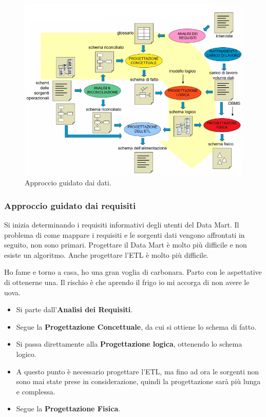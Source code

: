 \begin{figure}[H]
	\begin{center}
		\includegraphics[width=0.8\linewidth]{img/data_approach.png}
		\caption{Approccio guidato dai dati.}
	\end{center}
\end{figure}

\subsubsection{Approccio guidato dai requisiti}
Si inizia determinando i requisiti informativi degli utenti del Data Mart. Il problema di come mappare i requisiti e le sorgenti dati vengono affrontati in seguito, non sono primari.\newline
Progettare il Data Mart è molto più difficile e non esiste un algoritmo. Anche progettare l'ETL è molto più difficile.
\begin{info}
	Ho fame e torno a casa, ho una gran voglia di carbonara. Parto con le aspettative di ottenerne una. Il rischio è che aprendo il frigo io mi accorga di non avere le uova.
\end{info}

\begin{itemize}
	\item Si parte dall'\textbf{Analisi dei Requisiti}.
	\item Segue la \textbf{Progettazione Concettuale}, da cui si ottiene lo schema di fatto.
	\item Si passa direttamente alla \textbf{Progettazione logica}, ottenendo lo schema logico.
	\item A questo punto è necessario progettare l'ETL, ma fino ad ora le sorgenti non sono mai state prese in considerazione, quindi la progettazione sarà più lunga e complessa.
	\item Segue la \textbf{Progettazione Fisica}.
\end{itemize}

